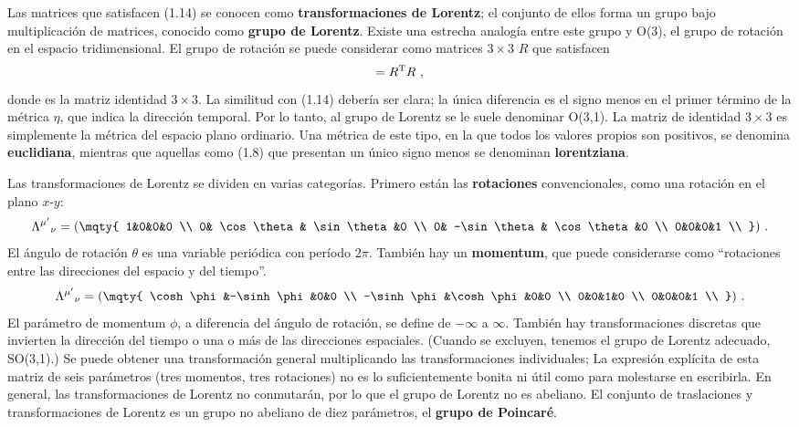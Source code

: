 \documentclass[11pt,b5paper,openany,twoside]{book}
\newcommand*{\bigone}{\text{\usefont{U}{bbold}{m}{n}1}}
\let\bigone\relax
\newcommand*{\bigone}{\text{\usefont{U}{bbold}{m}{n}1}}
\begin{document}
Las matrices que satisfacen (1.14) se conocen como {\bf transformaciones de Lorentz}; el conjunto de ellos forma un grupo bajo multiplicación de matrices, conocido como {\bf grupo de Lorentz}.
Existe una estrecha analogía entre este grupo y O(3), el grupo de rotación en el espacio tridimensional.
El grupo de rotación se puede considerar como matrices $3\times 3$ $R$ que satisfacen
\begin{equation}
\bigone = R^{\rm T} \bigone  R\ ,\label{1.16}
\end{equation}
donde \bigone es la matriz identidad $3\times 3$.
La similitud con (1.14) debería ser clara; la única diferencia es el signo menos en el primer término de la métrica $\eta$, que indica la dirección temporal.
Por lo tanto, al grupo de Lorentz se le suele denominar O(3,1).
La matriz de identidad $3\times 3$ es simplemente la métrica del espacio plano ordinario.
Una métrica de este tipo, en la que todos los valores propios son positivos, se denomina {\bf euclidiana}, mientras que aquellas como (1.8) que presentan un único signo menos se denominan {\bf lorentziana}.

Las transformaciones de Lorentz se dividen en varias categorías.
Primero están las {\bf rotaciones} convencionales, como una rotación en el plano $x$-$y$:
\begin{equation}
\Lambda^{\mu'}{}_\nu = \left(\mqty{ 1&0&0&0 \\
0& \cos\theta & \sin\theta &0 \\  0& -\sin\theta & \cos\theta &0 \\
0&0&0&1 \\ }\right)\,.\label{1.17}
\end{equation}
El ángulo de rotación $\theta$ es una variable periódica con período $2\pi$.
También hay un {\bf momentum}, que puede considerarse como ``rotaciones entre las direcciones del espacio y del tiempo''.
\begin{equation}
\Lambda^{\mu'}{}_\nu = \left(\mqty{ \cosh\phi&-\sinh\phi &0&0 \\
-\sinh\phi&\cosh\phi &0&0 \\  0&0&1&0 \\
0&0&0&1 \\ }\right)\,.\label{1.18}
\end{equation}
El parámetro de momentum $\phi$, a diferencia del ángulo de rotación, se define de $-\infty$ a $\infty$.
También hay transformaciones discretas que invierten la dirección del tiempo o una o más de las direcciones espaciales.
(Cuando se excluyen, tenemos el grupo de Lorentz adecuado, SO(3,1).)
Se puede obtener una transformación general multiplicando las transformaciones individuales; La expresión explícita de esta matriz de seis parámetros (tres momentos, tres rotaciones) no es lo suficientemente bonita ni útil como para molestarse en escribirla.
En general, las transformaciones de Lorentz no conmutarán, por lo que el grupo de Lorentz no es abeliano.
El conjunto de traslaciones y transformaciones de Lorentz es un grupo no abeliano de diez parámetros, el {\bf grupo de Poincaré}.
\end{document}
